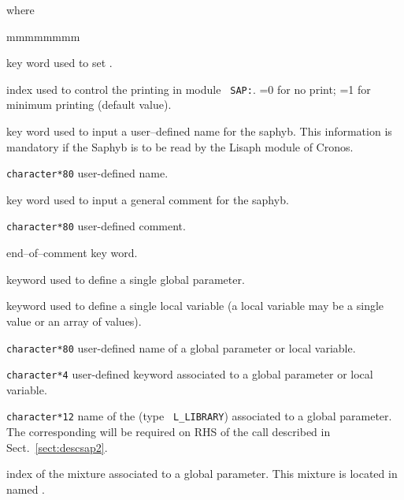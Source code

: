 \goodbreak
\noindent where
\begin{ListeDeDescription}{mmmmmmmm}

\item[\moc{EDIT}] key word used to set .

\item[\dusa{iprint}] index used to control the printing in module {\tt
SAP:}. =0 for no print; =1 for minimum printing (default value).

\item[\moc{NOML}] key word used to input a user--defined name for the {\sc saphyb}. This information is mandatory
if the Saphyb is to be read by the Lisaph module of Cronos.

\item[\dusa{nomlib}] {\tt character*80} user-defined name.

\item[\moc{COMM}] key word used to input a general comment for the {\sc saphyb}.

\item[\dusa{comment}] {\tt character*80} user-defined comment.

\item[\moc{ENDC}] end--of--comment key word.

\item[\moc{PARA}] keyword used to define a single global parameter.

\item[\moc{LOCA}] keyword used to define a single local variable (a local variable
may be a single value or an array of values).

\item[\dusa{parnam}] {\tt character*80} user-defined name of a global parameter or
local variable.

\item[\dusa{parkey}] {\tt character*4} user-defined keyword associated to a global
parameter or local variable.

\item[\dusa{micnam}] {\tt character*12} name of the  (type {\tt
L\_LIBRARY}) associated to a global parameter. The corresponding  will be required on
RHS of the  call described in Sect.~\ref{sect:descsap2}.

\item[\dusa{imix}] index of the mixture associated to a global parameter. This mixture is
located in  named .


\end{ListeDeDescription}
